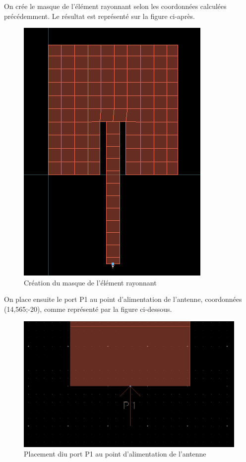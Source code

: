 \documentclass[16pt,a4paper,oneside,titlepage]{report}
\begin{document}
On crée le masque de l'élément rayonnant selon les coordonnées calculées précédemment. Le résultat est représenté sur la figure ci-après.
\begin{figure}[h]
\center
\includegraphics[scale=0.5]{Images/P3_Q2.png}
\caption{Création du masque de l'élément rayonnant}
\end{figure}

On place ensuite le port P1 au point d'alimentation de l'antenne, coordonnées (14,565;-20), comme représenté par la figure ci-dessous.
\begin{figure}[h]
\center
\includegraphics[scale=0.25]{Images/P3_Q3.png}
\caption{Placement diu port P1 au point d'alimentation de l'antenne}
\end{figure}
\end{document}
